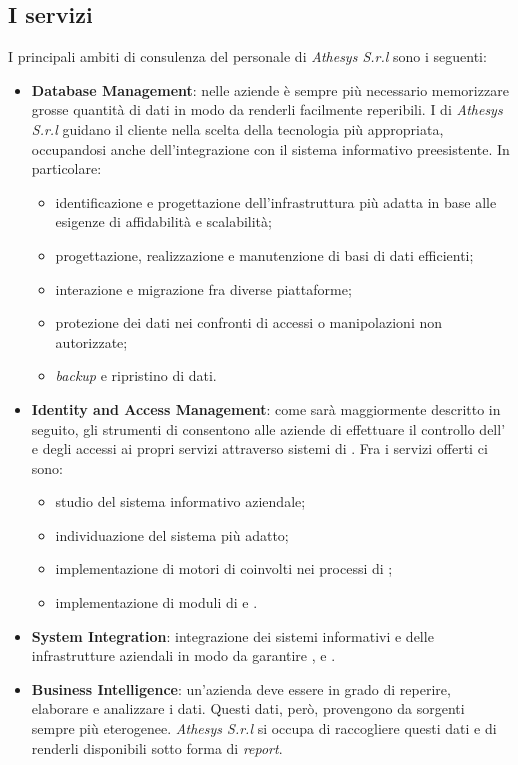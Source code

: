 \subsection{I servizi}
I principali ambiti di consulenza del personale di \textit{Athesys S.r.l} sono i seguenti:
\begin{itemize}
\item \textbf{Database Management}: nelle aziende è sempre più necessario memorizzare grosse quantità di dati in modo da renderli facilmente reperibili. I  di \textit{Athesys S.r.l} guidano il cliente nella scelta della tecnologia più appropriata, occupandosi anche dell'integrazione con il sistema informativo preesistente. In particolare:
	\begin{itemize}
	\item identificazione e progettazione dell'infrastruttura più adatta in base alle esigenze di affidabilità e scalabilità;
	\item progettazione, realizzazione e manutenzione di basi di dati efficienti;
	\item interazione e migrazione fra diverse piattaforme;
	\item protezione dei dati nei confronti di accessi o manipolazioni non autorizzate;
	\item \textit{backup} e ripristino di dati.
	\end{itemize}
\item \textbf{Identity and Access Management}: come sarà maggiormente descritto in seguito, gli strumenti di  consentono alle aziende di effettuare il controllo dell' e degli accessi ai propri servizi attraverso sistemi di . Fra i servizi offerti ci sono:
	\begin{itemize}
	\item studio del sistema informativo aziendale;
	\item individuazione del sistema  più adatto;
	\item implementazione di motori di  coinvolti nei processi di ;
	\item implementazione di moduli di  e .
	\end{itemize}
\item \textbf{System Integration}: integrazione dei sistemi informativi e delle infrastrutture aziendali in modo da garantire ,  e .
\item \textbf{Business Intelligence}: un'azienda deve essere in grado di reperire, elaborare e analizzare i dati. Questi dati, però, provengono da sorgenti sempre più eterogenee. \textit{Athesys S.r.l} si occupa di raccogliere questi dati e di renderli disponibili sotto forma di \textit{report}.
\end{itemize}

